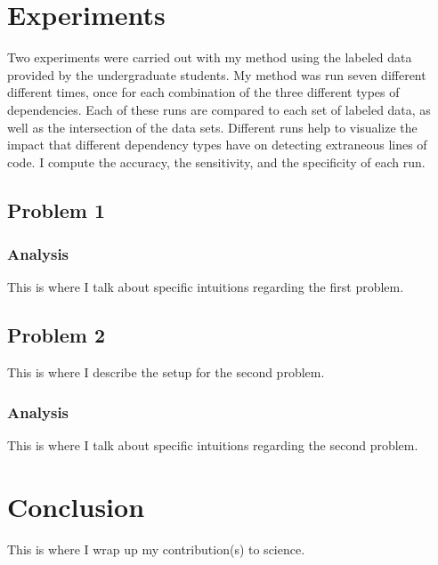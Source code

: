 \section{Experiments}
Two experiments were carried out with my method using the labeled data provided by the undergraduate students. My method was run seven different different times, once for each combination of the three different types of dependencies. Each of these runs are compared to each set of labeled data, as well as the intersection of the data sets. Different runs help to visualize the impact that different dependency types have on detecting extraneous lines of code. I compute the accuracy, the sensitivity, and the specificity of each run.



\subsection{Problem 1}


\subsubsection{Analysis}
This is where I talk about specific intuitions regarding the first problem.

\subsection{Problem 2}
This is where I describe the setup for the second problem.

\subsubsection{Analysis}
This is where I talk about specific intuitions regarding the second problem.

\section{Conclusion}
This is where I wrap up my contribution(s) to science.

